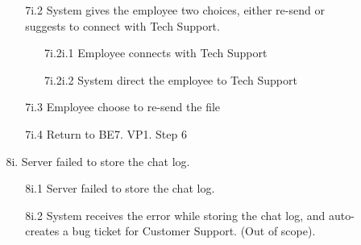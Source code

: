 \documentclass[]{article}
\begin{document}
\begin{enumerate}[{\bf BE1.}]
\begin{enumerate}[{\bf BE7.}]
\begin{enumerate}
\begin{enumerate}
                        \item[7i.2] System gives the employee two choices, either re-send or suggests to connect with Tech Support. 
			\begin{enumerate}
   				\item[7i.2i.1] Employee connects with Tech Support
       				\item[7i.2i.2] System direct the employee to Tech Support
	   		\end{enumerate}
	   		\item[7i.3]Employee choose to re-send the file
    			\item[7i.4] Return to BE7. VP1. Step 6
                    \end{enumerate}
                    \item[8i.] Server failed to store the chat log.
                    \begin{enumerate}
                        \item[8i.1] Server failed to store the chat log.
                        \item[8i.2] System receives the error while storing the chat log, and auto-creates a bug ticket for Customer Support. (Out of scope).
                    \end{enumerate}
                \end{enumerate}
\end{enumerate}




\end{enumerate}
\end{document}

